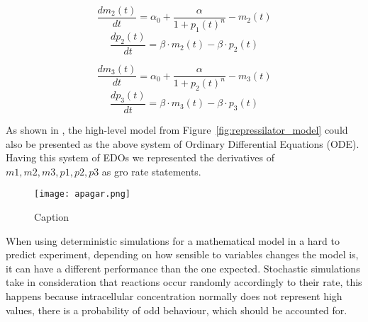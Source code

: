 \documentclass[12pt]{article}
\begin{document}
    \begin{multicols}{2}
    \begin{equation*}
    \frac{dm_{2}(t)}{dt} = \alpha_{0} + \frac{\alpha}{1 + p_{1}(t)^{n}} - m_{2}(t)
    \end{equation*}\break
    \begin{equation*}
    \frac{dp_{2}(t)}{dt} = \beta \cdot m_{2}(t) - \beta \cdot p_{2}(t)
    \end{equation*}
    \end{multicols}
    
    \begin{multicols}{2}
    \begin{equation*}
    \frac{dm_{3}(t)}{dt} = \alpha_{0} + \frac{\alpha}{1 + p_{2}(t)^{n}} - m_{3}(t)
    \end{equation*}\break
    \begin{equation*}
    \frac{dp_{3}(t)}{dt} = \beta \cdot m_{3}(t) - \beta \cdot p_{3}(t)
    \end{equation*}
    \end{multicols}
    
    As shown in \cite{Elowitz2000}, the high-level model from Figure~\ref{fig:repressilator_model} could also be presented as the above system of Ordinary Differential Equations (ODE). Having this system of EDOs we represented the derivatives of $m1, m2, m3, p1, p2, p3$ as gro rate statements.
    
    


\begin{figure}[h]
    \centering
    \texttt{[image: apagar.png]}
    \caption{Caption}
    \label{fig:phase_plane_repressilator}
\end{figure}
When using deterministic simulations for a mathematical model in a hard to predict experiment, depending on how sensible to variables changes the model is, it can have a different performance than the one expected.\cite{Hahl2016} Stochastic simulations take in consideration that reactions occur randomly accordingly to their rate, this happens because intracellular concentration normally does not represent high values, there is a probability of odd behaviour, which should be accounted for.\cite{Bratsun2005}
\end{document}
